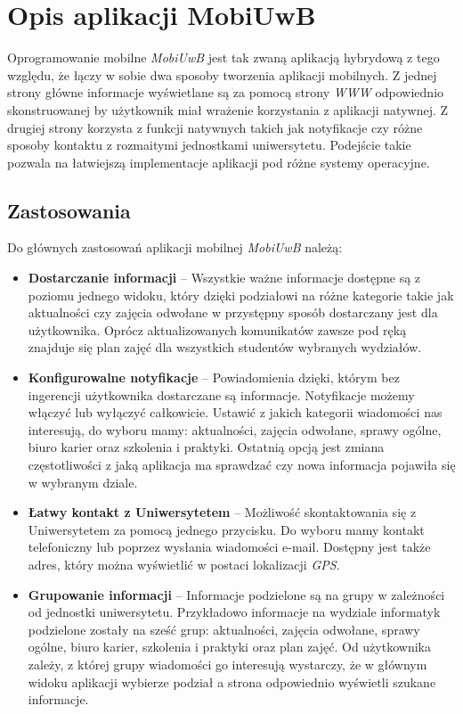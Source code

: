 \documentclass{iiuwb}
\begin{document}
\section{Opis aplikacji MobiUwB}
Oprogramowanie mobilne \textit{MobiUwB} jest tak zwaną aplikacją hybrydową z tego względu, że łączy w sobie dwa sposoby tworzenia aplikacji mobilnych. Z jednej strony główne informacje wyświetlane są za pomocą strony \textit{WWW} odpowiednio skonstruowanej by użytkownik miał wrażenie korzystania z aplikacji natywnej. Z drugiej strony korzysta z funkcji natywnych takich jak notyfikacje czy różne sposoby kontaktu z rozmaitymi jednostkami uniwersytetu. Podejście takie pozwala na łatwiejszą implementacje aplikacji pod różne systemy operacyjne.
\subsection{Zastosowania}
Do głównych zastosowań aplikacji mobilnej \textit{MobiUwB} należą:
\begin{itemize}
\item \textbf{Dostarczanie informacji} -- Wszystkie ważne informacje dostępne są z poziomu jednego widoku, który dzięki podziałowi na różne kategorie takie jak aktualności czy zajęcia odwołane w przystępny sposób dostarczany jest dla użytkownika. Oprócz aktualizowanych komunikatów zawsze pod ręką znajduje się plan zajęć dla wszystkich studentów wybranych wydziałów.
\item \textbf{Konfigurowalne notyfikacje} -- Powiadomienia dzięki, którym bez ingerencji użytkownika dostarczane są informacje. Notyfikacje możemy włączyć lub wyłączyć całkowicie. Ustawić z jakich kategorii wiadomości nas interesują, do wyboru mamy: aktualności, zajęcia odwołane, sprawy ogólne, biuro karier oraz szkolenia i praktyki. Ostatnią opcją jest zmiana częstotliwości z jaką aplikacja ma sprawdzać czy nowa informacja pojawiła się w wybranym dziale.
\item \textbf{Łatwy kontakt z Uniwersytetem} -- Możliwość skontaktowania się z Uniwersytetem za pomocą jednego przycisku. Do wyboru mamy kontakt telefoniczny lub poprzez wysłania wiadomości e-mail. Dostępny jest także adres, który można wyświetlić w postaci lokalizacji \textit{GPS}.
\item \textbf{Grupowanie informacji} -- Informacje podzielone są na grupy w zależności od jednostki uniwersytetu. Przykładowo informacje na wydziale  informatyk podzielone zostały na sześć grup: aktualności, zajęcia odwołane, sprawy ogólne, biuro karier, szkolenia i praktyki oraz plan zajęć. Od użytkownika zależy, z której grupy wiadomości go interesują wystarczy, że w głównym widoku aplikacji wybierze podział a strona odpowiednio wyświetli szukane informacje.
\end{itemize}
\end{document}
